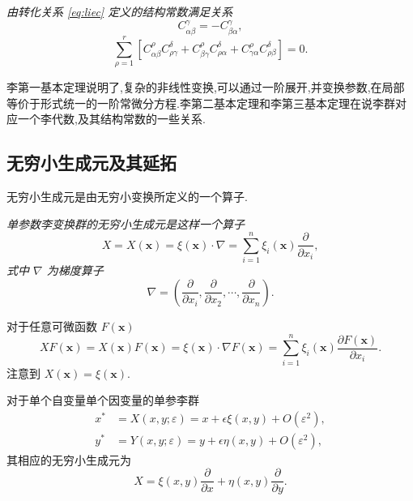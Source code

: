 \begin{theorem}[李第三基本定理]
\emph{由转化关系 \eqref{eq:liec} 定义的结构常数满足关系
\begin{equation*}
C_{\alpha\beta}^{\gamma}=-C_{\beta\alpha}^{\gamma},
\end{equation*}
\begin{equation*}
\sum_{\rho=1}^{r}[C_{\alpha\beta}^{\rho}C_{\rho\gamma}^{\delta}+C_{\beta\gamma}^{\rho}C_{\rho\alpha}^{\delta}+C_{\gamma\alpha}^{\rho}C_{\rho\beta}^{\delta}]=0.
\end{equation*}}
\end{theorem}

李第一基本定理说明了,复杂的非线性变换,可以通过一阶展开,并变换参数,在局部等价于形式统一的一阶常微分方程.李第二基本定理和李第三基本定理在说李群对应一个李代数,及其结构常数的一些关系.

\subsection{无穷小生成元及其延拓}
无穷小生成元是由无穷小变换所定义的一个算子.
\begin{definition}[无穷小生成元]
\emph{	单参数李变换群的无穷小生成元是这样一个算子
	\begin{equation*}
		X=X(\mathbf{x})=\xi(\mathbf{x})\cdot \nabla = \sum_{i=1}^{n}\xi_i(\mathbf{x})\frac{\partial}{\partial x_i},
	\end{equation*}
	式中 $\nabla$ 为梯度算子
	\begin{equation*}
		\nabla=\left(\frac{\partial}{\partial x_i},\frac{\partial}{\partial x_2},\cdots,\frac{\partial}{\partial x_n}\right).
	\end{equation*}}
\end{definition}

对于任意可微函数 $F(\mathbf{x})$
\begin{equation*}
	XF(\mathbf{x})=X(\mathbf{x})F(\mathbf{x})=\xi(\mathbf{x})\cdot \nabla F(\mathbf{x}) = \sum_{i=1}^{n}\xi_i(\mathbf{x})\frac{\partial F(\mathbf{x})}{\partial x_i}.
\end{equation*}
注意到 $X(\mathbf{x})=\xi(\mathbf{x})$.

对于单个自变量单个因变量的单参李群
\begin{equation*}
\begin{aligned}
x^*&=X(x,y;\varepsilon)=x+\epsilon \xi(x,y)+O(\varepsilon^2),\\
y^*&=Y(x,y;\varepsilon)=y+\epsilon \eta(x,y)+O(\varepsilon^2),
\end{aligned}
\end{equation*}
其相应的无穷小生成元为
\begin{equation*}
X=\xi(x,y)\frac{\partial}{\partial x}+\eta(x,y)\frac{\partial}{\partial y}.
\end{equation*}

